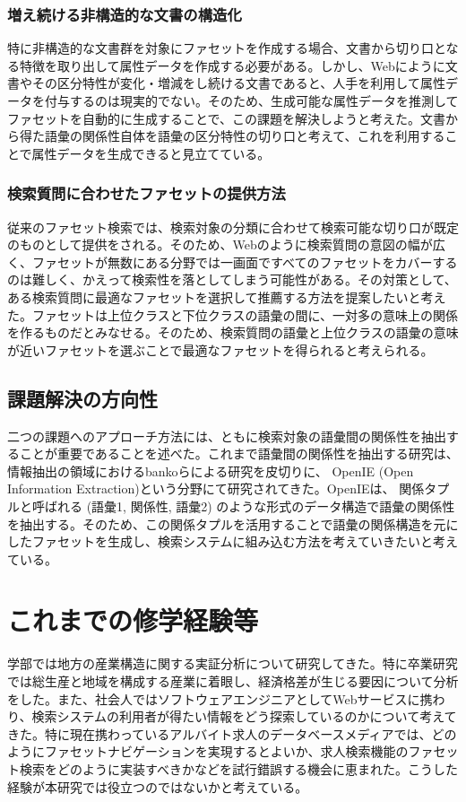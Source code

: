 \documentclass[a4j,10pt, twocolumn]{jarticle} \usepackage[dvipdfmx]{graphicx} \usepackage{amssymb} \usepackage{amsmath}
\begin{document}
\subsubsection{増え続ける非構造的な文書の構造化}
 特に非構造的な文書群を対象にファセットを作成する場合、文書から切り口となる特徴を取り出して属性データを作成する必要がある。しかし、Webにように文書やその区分特性が変化・増減をし続ける文書であると、人手を利用して属性データを付与するのは現実的でない。そのため、生成可能な属性データを推測してファセットを自動的に生成することで、この課題を解決しようと考えた。文書から得た語彙の関係性自体を語彙の区分特性の切り口と考えて、これを利用することで属性データを生成できると見立てている。
\subsubsection{検索質問に合わせたファセットの提供方法}
 従来のファセット検索では、検索対象の分類に合わせて検索可能な切り口が既定のものとして提供をされる。そのため、Webのように検索質問の意図の幅が広く、ファセットが無数にある分野では一画面ですべてのファセットをカバーするのは難しく、かえって検索性を落としてしまう可能性がある。その対策として、ある検索質問に最適なファセットを選択して推薦する方法を提案したいと考えた。ファセットは上位クラスと下位クラスの語彙の間に、一対多の意味上の関係を作るものだとみなせる。そのため、検索質問の語彙と上位クラスの語彙の意味が近いファセットを選ぶことで最適なファセットを得られると考えられる。

\subsection{課題解決の方向性}
二つの課題へのアプローチ方法には、ともに検索対象の語彙間の関係性を抽出することが重要であることを述べた。これまで語彙間の関係性を抽出する研究は、情報抽出の領域におけるbankoらによる研究\cite{banko}を皮切りに、 OpenIE (Open Information Extraction)という分野にて研究されてきた\cite{niklaus}。OpenIEは、 関係タプルと呼ばれる (語彙1, 関係性, 語彙2) のような形式のデータ構造で語彙の関係性を抽出する。そのため、この関係タプルを活用することで語彙の関係構造を元にしたファセットを生成し、検索システムに組み込む方法を考えていきたいと考えている。

\section{これまでの修学経験等}
 学部では地方の産業構造に関する実証分析について研究してきた。特に卒業研究では総生産と地域を構成する産業に着眼し、経済格差が生じる要因について分析をした。また、社会人ではソフトウェアエンジニアとしてWebサービスに携わり、検索システムの利用者が得たい情報をどう探索しているのかについて考えてきた。特に現在携わっているアルバイト求人のデータベースメディアでは、どのようにファセットナビゲーションを実現するとよいか、求人検索機能のファセット検索をどのように実装すべきかなどを試行錯誤する機会に恵まれた。こうした経験が本研究では役立つのではないかと考えている。
\end{document}
